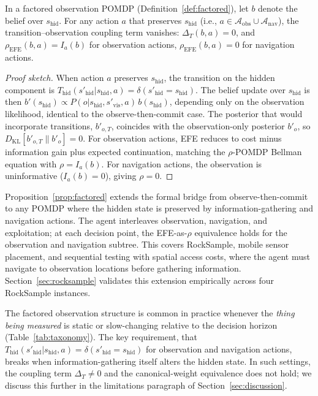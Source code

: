 \documentclass[runningheads]{llncs}
\begin{document}
\begin{proposition}
\label{prop:factored}
In a factored observation POMDP (Definition~\ref{def:factored}), let $b$ denote the belief over $s_{\mathrm{hid}}$. For any action $a$ that preserves $s_{\mathrm{hid}}$ (i.e., $a \in \mathcal{A}_{\mathrm{obs}} \cup \mathcal{A}_{\mathrm{nav}}$), the transition--observation coupling term vanishes: $\Delta_T(b, a) = 0$, and $\rho_{\mathrm{EFE}}(b, a) = I_a(b)$ for observation actions, $\rho_{\mathrm{EFE}}(b, a) = 0$ for navigation actions.
\end{proposition}

\begin{proof}[Proof sketch]
When action $a$ preserves $s_{\mathrm{hid}}$, the transition on the hidden component is $T_{\mathrm{hid}}(s'_{\mathrm{hid}} | s_{\mathrm{hid}}, a) = \delta(s'_{\mathrm{hid}} = s_{\mathrm{hid}})$. The belief update over $s_{\mathrm{hid}}$ is then $b'(s_{\mathrm{hid}}) \propto P(o | s_{\mathrm{hid}}, s'_{\mathrm{vis}}, a)\, b(s_{\mathrm{hid}})$, depending only on the observation likelihood, identical to the observe-then-commit case. The posterior that would incorporate transitions, $b'_{o,T}$, coincides with the observation-only posterior $b'_o$, so $D_{\mathrm{KL}}[b'_{o,T} \| b'_o] = 0$. For observation actions, EFE reduces to cost minus information gain plus expected continuation, matching the $\rho$-POMDP Bellman equation with $\rho = I_a(b)$. For navigation actions, the observation is uninformative ($I_a(b) = 0$), giving $\rho = 0$.
\end{proof}

Proposition~\ref{prop:factored} extends the formal bridge from observe-then-commit to any POMDP where the hidden state is preserved by information-gathering and navigation actions. The agent interleaves observation, navigation, and exploitation; at each decision point, the EFE-as-$\rho$ equivalence holds for the observation and navigation subtree. This covers RockSample, mobile sensor placement, and sequential testing with spatial access costs, where the agent must navigate to observation locations before gathering information. Section~\ref{sec:rocksample} validates this extension empirically across four RockSample instances.

The factored observation structure is common in practice whenever the \emph{thing being measured} is static or slow-changing relative to the decision horizon (Table~\ref{tab:taxonomy}). The key requirement, that $T_{\mathrm{hid}}(s'_{\mathrm{hid}} | s_{\mathrm{hid}}, a) = \delta(s'_{\mathrm{hid}} = s_{\mathrm{hid}})$ for observation and navigation actions, breaks when information-gathering itself alters the hidden state. In such settings, the coupling term $\Delta_T \neq 0$ and the canonical-weight equivalence does not hold; we discuss this further in the limitations paragraph of Section~\ref{sec:discussion}.
\end{document}
